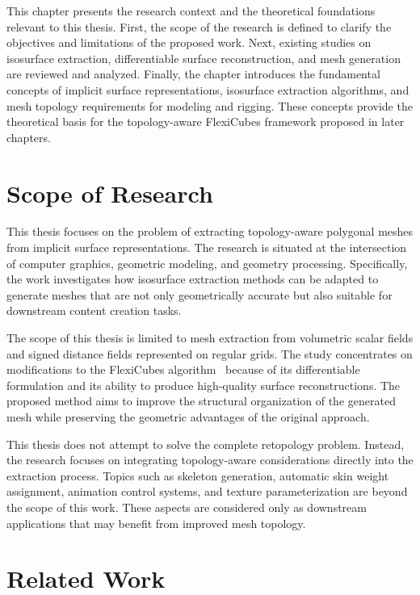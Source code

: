 \documentclass[../main.tex]{subfiles}
\begin{document}
This chapter presents the research context and the theoretical foundations relevant to this thesis. First, the scope of the research is defined to clarify the objectives and limitations of the proposed work. Next, existing studies on isosurface extraction, differentiable surface reconstruction, and mesh generation are reviewed and analyzed. Finally, the chapter introduces the fundamental concepts of implicit surface representations, isosurface extraction algorithms, and mesh topology requirements for modeling and rigging. These concepts provide the theoretical basis for the topology-aware FlexiCubes framework proposed in later chapters.

\section{Scope of Research}

This thesis focuses on the problem of extracting topology-aware polygonal meshes from implicit surface representations. The research is situated at the intersection of computer graphics, geometric modeling, and geometry processing. Specifically, the work investigates how isosurface extraction methods can be adapted to generate meshes that are not only geometrically accurate but also suitable for downstream content creation tasks.

The scope of this thesis is limited to mesh extraction from volumetric scalar fields and signed distance fields represented on regular grids. The study concentrates on modifications to the FlexiCubes algorithm~\cite{shen2023flexicubes} because of its differentiable formulation and its ability to produce high-quality surface reconstructions. The proposed method aims to improve the structural organization of the generated mesh while preserving the geometric advantages of the original approach.

This thesis does not attempt to solve the complete retopology problem. Instead, the research focuses on integrating topology-aware considerations directly into the extraction process. Topics such as skeleton generation, automatic skin weight assignment, animation control systems, and texture parameterization are beyond the scope of this work. These aspects are considered only as downstream applications that may benefit from improved mesh topology.

\section{Related Work}
\end{document}
